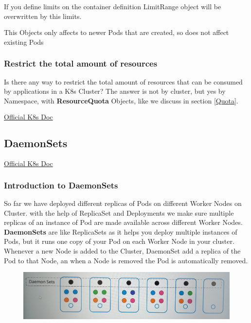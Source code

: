\documentclass{article}
\newenvironment{blocktemplateIII}[1]{%
    \tcolorbox[beamer,%
    noparskip,breakable,
    ,colframe=Red,%
    colbacklower=LimeGreen!75!LightGreen,%
    title=#1]}%
    {\endtcolorbox}
\begin{document}
\begin{blocktemplateIII}{WARNING 1}
If you define limits on the container definition LimitRange object will be overwritten by this limits.
\end{blocktemplateIII}

\begin{blocktemplateIII}{WARNING 2}
This Objects only affects to newer Pods that are created, so does not affect existing Pods
\end{blocktemplateIII}

\subsubsection{Restrict the total amount of resources}

Is there any way to restrict the total amount of resources that can be consumed by applications in a K8s Cluster? The answer is not by cluster, but yes by Namespace, with \textbf{ResourceQuota} Objects, like we discuss in section \ref{Quota}.

\href{https://kubernetes.io/docs/tasks/administer-cluster/manage-resources/quota-memory-cpu-namespace/}{Official K8s Doc}

\subsection{DaemonSets}

\href{https://kubernetes.io/es/docs/concepts/workloads/controllers/daemonset/}{Official K8s Doc}

\subsubsection{Introduction to DaemonSets}

So far we have deployed different replicas of Pods on different Worker Nodes on Cluster. with the help of ReplicaSet and Deployments we make sure multiple replicas of an instance of Pod are made available across different Worker Nodes. \textbf{DaemonSets} are like ReplicaSets as it helps you deploy multiple instances of Pods, but it runs one copy of your Pod on each Worker Node in your cluster. Whenever a new Node is added to the Cluster, DaemonSet add a replica of the Pod to that Node, an when a Node is removed the Pod is automatically removed.

\begin{figure}[H]
    \includegraphics[width=\textwidth]{pictures/ds.png}
\end{figure}
\end{document}

